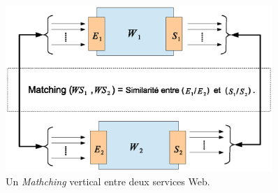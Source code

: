 
\begin{figure}[h]
    \centering
    \includegraphics[width=0.9\textwidth]{figs/matching-general.eps}
    \caption{Un \textit{Mathching} vertical entre deux services Web.}
    \label{fig:matching-general}
\end{figure}

